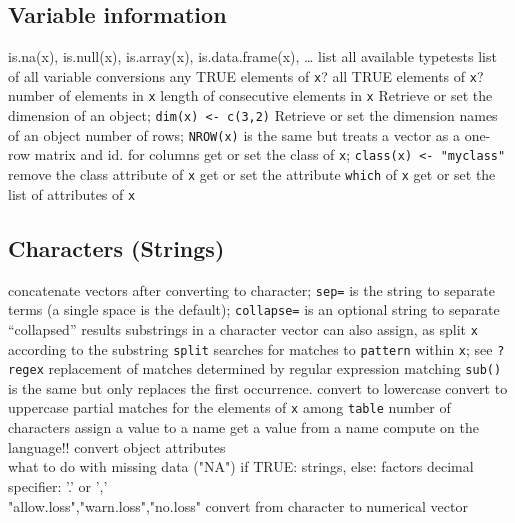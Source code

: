 \subsection{Variable information}{is.na(x), is.null(x), is.array(x), is.data.frame(x), \ldots}
	{list all available typetests}
	{list of all variable conversions}
	{any TRUE elements of {\tt x}?}
	{all TRUE elements of {\tt x}?}
	{ number of elements in {\tt x}}
	{length of consecutive elements in {\tt x}}
	{Retrieve or set the dimension of an object; {\tt dim(x) <- c(3,2)}}
	{Retrieve or set the dimension names of an object}
	{number of rows; {\tt NROW(x)} is the same but treats a vector as a one-row matrix}
	{and}
	{id. for columns}
	{get or set the class of {\tt x}; {\tt class(x) <- "myclass"}}
	{remove the class attribute of {\tt x}}
	{get or set the attribute {\tt which} of {\tt x}}
	{get or set the list of attributes of {\tt x}}

\subsection{Characters (Strings)}{}
	{concatenate vectors after converting to character; {\tt sep=} is the string to separate terms (a single space is the default); {\tt collapse=} is an optional string to separate ``collapsed'' results}
	{substrings in a character vector}
	{can also assign, as}
	{split {\tt x} according to the substring {\tt split}}
	{searches for matches to {\tt pattern} within {\tt x}; see {\tt ?regex}}
	{replacement of matches determined by regular expression matching {\tt sub()} is the same but only replaces the first occurrence.}
	{convert to lowercase}
	{convert to uppercase}
	{partial matches for the elements of {\tt x} among {\tt table}}
	{number of characters}
	{assign a value to a name}
	{get a value from a name}
	{compute on the language!!}
	{convert object attributes}
	{\\ what to do with missing data ("NA")}
	{if TRUE: strings, else: factors}
	{decimal specifier: '.' or ','}
	{\\"allow.loss","warn.loss","no.loss"}
	{convert from character to numerical vector}

